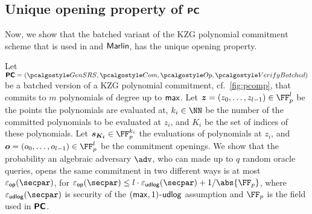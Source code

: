 \subsection{Unique opening property of $\bm{\mathsf{PC}}$}
Now, we show that the batched variant of the KZG polynomial
commitment scheme that is used in \plonk{} and ${\textnormal{\textsf{Marlin}}}{}$, has the unique opening property.

\begin{lemma}
\label{lem:pcomp_op}
Let $\PCOM = (\kgen, \com, \open, \verifyb)$ be a batched version of a KZG polynomial commitment,
cf.~\cref{fig:pcomp}, that commits to $m$ polynomials of degree up to $\mathsf{max}$. Let $\vec{z} = (z_0, \ldots, z_{l - 1}) \in \FF_p^l$ be the points the polynomials are  evaluated at, $k_i \in \NN$ be the number of the committed polynomials to be evaluated at $z_i$, and $K_i$ be the set of indices of these polynomials. Let $\vec{s_{K_i}} \in \FF_p^{k_i}$ the evaluations of polynomials at $z_i$, and $\vec{o} = (o_0, \ldots, o_{l - 1}) \in \FF_p^l$ be the commitment openings. We show that the probability an algebraic adversary $\adv$, who can made up to $q$ random oracle queries, opens the same commitment in two different ways is at most $\epsop(\secpar)$, for $\epsop(\secpar) \leq l \cdot  \epsudlog(\secpar) + \infrac{1}{\abs{\FF_p}}$, where $\epsudlog(\secpar)$ is security of the $(\mathsf{max}, 1)$-$\mathsf{udlog}$ assumption and $\FF_p$ is the field used in $\bm{\mathsf{PC}}$.
\end{lemma}

